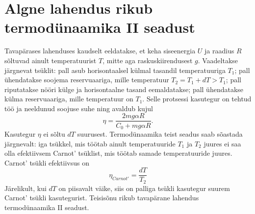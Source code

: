 \documentclass{trkut}%
\begin{document}
\section{Algne lahendus rikub termodünaamika II seadust} \label{rikub}

Tavapärases lahenduses kaudselt eeldatakse, et keha siseenergia \(U\) ja raadius \(R\) sõltuvad ainult temperatuurist \(T\), mitte aga raskuskiirendusest \(g\). Vaadeltakse järgnevat tsüklit: pall asub horisontaalsel külmal tasandil temperatuuriga \(T_1\); pall ühendatakse soojema reservuaariga, mille temperatuur \(T_2=T_1+dT>T_1\); pall riputatakse nööri külge ja horisontaalne tasand eemaldatakse; pall ühendatakse külma reservuaariga, mille temperatuur on \(T_1\). Selle protsessi kasutegur on tehtud töö ja neeldunud soojuse suhe ning avaldub kujul \parencite[3-5]{palma15}
\begin{equation}
    \eta = \frac{2mg\alpha R}{C_0+mg\alpha R}.
\end{equation}
Kasutegur \(\eta\) ei sõltu \(dT\) suurusest. Termodünaamika teist seadus saab sõastada järgnevalt: iga tsükkel, mis töötab ainult temperatuuride \(T_1\) ja \(T_2\) juures ei saa olla efektiivsem Carnot' tsüklist, mis töötab samade temperatuuride juures. Carnot' tsükli efektiivsus on \parencite[3-5]{palma15}
\begin{equation}
    \eta_{Carnot'} = \frac{dT}{T_2}
\end{equation}
Järelikult, kui \(dT\) on piisavalt väike, siis on palliga tsükli kasutegur suurem Carnot' tsükli kasutegurist. Teisisõnu rikub tavapärane lahendus termodünaamika II seadust.


%
\end{document}
